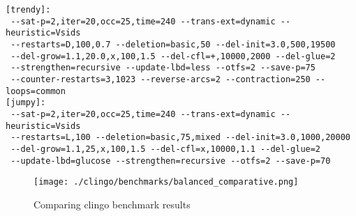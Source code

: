 \documentclass[11pt]{article}
\begin{document}
\begin{verbatim}
[trendy]:
 --sat-p=2,iter=20,occ=25,time=240 --trans-ext=dynamic --heuristic=Vsids
 --restarts=D,100,0.7 --deletion=basic,50 --del-init=3.0,500,19500
 --del-grow=1.1,20.0,x,100,1.5 --del-cfl=+,10000,2000 --del-glue=2
 --strengthen=recursive --update-lbd=less --otfs=2 --save-p=75
 --counter-restarts=3,1023 --reverse-arcs=2 --contraction=250 --loops=common
[jumpy]:
 --sat-p=2,iter=20,occ=25,time=240 --trans-ext=dynamic --heuristic=Vsids
 --restarts=L,100 --deletion=basic,75,mixed --del-init=3.0,1000,20000
 --del-grow=1.1,25,x,100,1.5 --del-cfl=x,10000,1.1 --del-glue=2
 --update-lbd=glucose --strengthen=recursive --otfs=2 --save-p=70
\end{verbatim}









\begin{figure}[]
  \centering
  \texttt{[image: ./clingo/benchmarks/balanced\_comparative.png]}
  \caption{Comparing clingo benchmark results}
  \label{fig:clingo-bench-comparative}
\end{figure}

\end{document}
